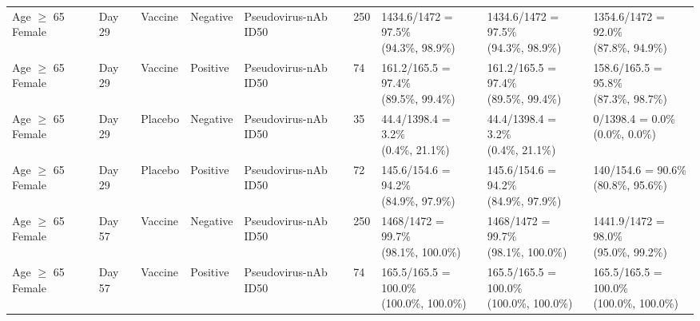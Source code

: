 \documentclass[]{book}
\theoremstyle{definition}
\theoremstyle{definition}
\theoremstyle{definition}
\newcommand{\1}{\mathbbm{1}}
\begin{document}
\begin{landscape}
\begin{ThreePartTable}
\begin{longtable}[t]{>{\raggedright\arraybackslash}p{2.7cm}llllllll}
\hspace{1em}Age $\geq$ 65 Female & Day 29 & Vaccine & Negative & Pseudovirus-nAb ID50 & 250 & \makecell[l]{1434.6/1472 = 97.5\%\\(94.3\%, 98.9\%)} & \makecell[l]{1434.6/1472 = 97.5\%\\(94.3\%, 98.9\%)} & \makecell[l]{1354.6/1472 = 92.0\%\\(87.8\%, 94.9\%)}\\
\hspace{1em}Age $\geq$ 65 Female & Day 29 & Vaccine & Positive & Pseudovirus-nAb ID50 & 74 & \makecell[l]{161.2/165.5 = 97.4\%\\(89.5\%, 99.4\%)} & \makecell[l]{161.2/165.5 = 97.4\%\\(89.5\%, 99.4\%)} & \makecell[l]{158.6/165.5 = 95.8\%\\(87.3\%, 98.7\%)}\\
\hspace{1em}Age $\geq$ 65 Female & Day 29 & Placebo & Negative & Pseudovirus-nAb ID50 & 35 & \makecell[l]{44.4/1398.4 = 3.2\%\\(0.4\%, 21.1\%)} & \makecell[l]{44.4/1398.4 = 3.2\%\\(0.4\%, 21.1\%)} & \makecell[l]{0/1398.4 = 0.0\%\\(0.0\%, 0.0\%)}\\
\hspace{1em}Age $\geq$ 65 Female & Day 29 & Placebo & Positive & Pseudovirus-nAb ID50 & 72 & \makecell[l]{145.6/154.6 = 94.2\%\\(84.9\%, 97.9\%)} & \makecell[l]{145.6/154.6 = 94.2\%\\(84.9\%, 97.9\%)} & \makecell[l]{140/154.6 = 90.6\%\\(80.8\%, 95.6\%)}\\
\hspace{1em}Age $\geq$ 65 Female & Day 57 & Vaccine & Negative & Pseudovirus-nAb ID50 & 250 & \makecell[l]{1468/1472 = 99.7\%\\(98.1\%, 100.0\%)} & \makecell[l]{1468/1472 = 99.7\%\\(98.1\%, 100.0\%)} & \makecell[l]{1441.9/1472 = 98.0\%\\(95.0\%, 99.2\%)}\\
\hspace{1em}Age $\geq$ 65 Female & Day 57 & Vaccine & Positive & Pseudovirus-nAb ID50 & 74 & \makecell[l]{165.5/165.5 = 100.0\%\\(100.0\%, 100.0\%)} & \makecell[l]{165.5/165.5 = 100.0\%\\(100.0\%, 100.0\%)} & \makecell[l]{165.5/165.5 = 100.0\%\\(100.0\%, 100.0\%)}\\

\end{longtable}
\end{ThreePartTable}
\end{landscape}
\end{document}
